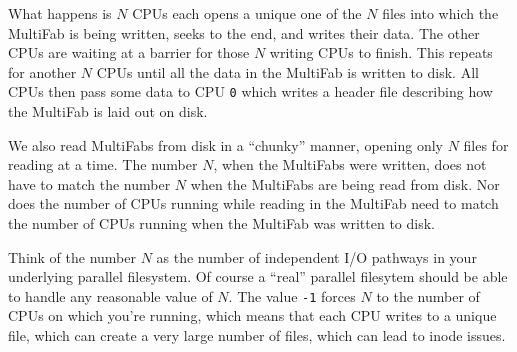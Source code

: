 What happens is $N$ CPUs each opens a unique one of the $N$ files into
which the MultiFab is being written, seeks to the end, and writes
their data.  The other CPUs are waiting at a barrier for those $N$
writing CPUs to finish.  This repeats for another $N$ CPUs until all the
data in the MultiFab is written to disk.  All CPUs then pass some data
to CPU {\tt 0} which writes a header file describing how the MultiFab is
laid out on disk.

We also read MultiFabs from disk in a ``chunky'' manner, opening only $N$
files for reading at a time.  The number $N$, when the MultiFabs were
written, does not have to match the number $N$ when the MultiFabs are
being read from disk.  Nor does the number of CPUs running while
reading in the MultiFab need to match the number of CPUs running when
the MultiFab was written to disk.

Think of the number $N$ as the number of independent I/O pathways in
your underlying parallel filesystem.  Of course a ``real'' parallel
filesytem should be able to handle any reasonable value of $N$.  The
value {\tt -1} forces $N$ to the number of CPUs on which you're
running, which means that each CPU writes to a unique file, which can
create a very large number of files, which can lead to inode issues.


